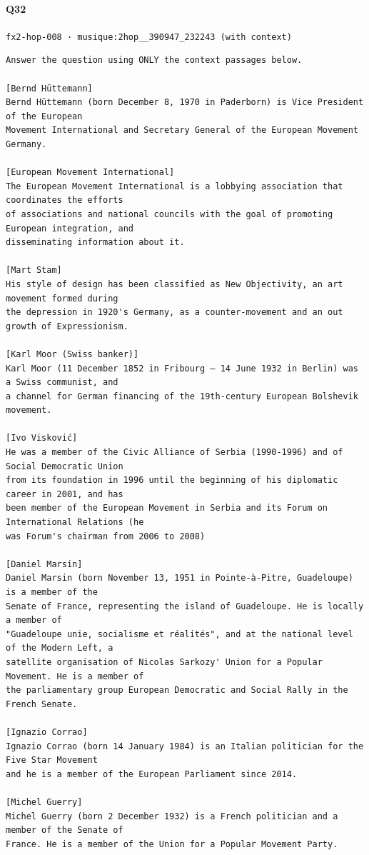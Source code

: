 \documentclass[10pt]{article}
\begin{document}
\paragraph{Q32} \texttt{fx2-hop-008  ·  musique:2hop\_\_390947\_232243 (with context)}
\begin{verbatim}
Answer the question using ONLY the context passages below.

[Bernd Hüttemann]
Bernd Hüttemann (born December 8, 1970 in Paderborn) is Vice President of the European
Movement International and Secretary General of the European Movement Germany.

[European Movement International]
The European Movement International is a lobbying association that coordinates the efforts
of associations and national councils with the goal of promoting European integration, and
disseminating information about it.

[Mart Stam]
His style of design has been classified as New Objectivity, an art movement formed during
the depression in 1920's Germany, as a counter-movement and an out growth of Expressionism.

[Karl Moor (Swiss banker)]
Karl Moor (11 December 1852 in Fribourg – 14 June 1932 in Berlin) was a Swiss communist, and
a channel for German financing of the 19th-century European Bolshevik movement.

[Ivo Visković]
He was a member of the Civic Alliance of Serbia (1990-1996) and of Social Democratic Union
from its foundation in 1996 until the beginning of his diplomatic career in 2001, and has
been member of the European Movement in Serbia and its Forum on International Relations (he
was Forum's chairman from 2006 to 2008)

[Daniel Marsin]
Daniel Marsin (born November 13, 1951 in Pointe-à-Pitre, Guadeloupe) is a member of the
Senate of France, representing the island of Guadeloupe. He is locally a member of
"Guadeloupe unie, socialisme et réalités", and at the national level of the Modern Left, a
satellite organisation of Nicolas Sarkozy' Union for a Popular Movement. He is a member of
the parliamentary group European Democratic and Social Rally in the French Senate.

[Ignazio Corrao]
Ignazio Corrao (born 14 January 1984) is an Italian politician for the Five Star Movement
and he is a member of the European Parliament since 2014.

[Michel Guerry]
Michel Guerry (born 2 December 1932) is a French politician and a member of the Senate of
France. He is a member of the Union for a Popular Movement Party.


\end{verbatim}
\end{document}
